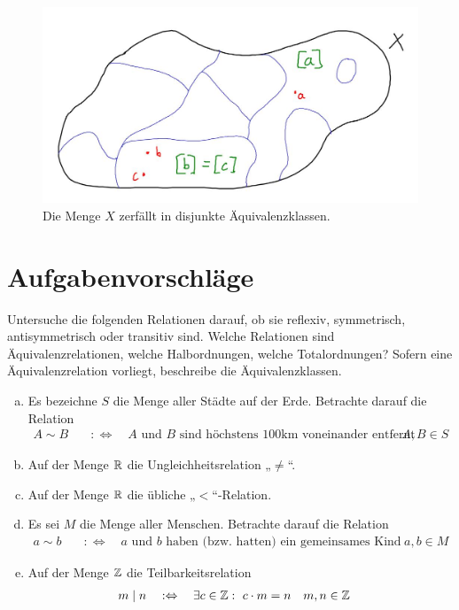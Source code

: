 \begin{figure}[h]
	\centering
\includegraphics[width=12cm]{./_img/equivalence.jpeg}
	\caption{Die Menge $X$ zerfällt in disjunkte Äquivalenzklassen.}
\end{figure}




\clearpage
\section{Aufgabenvorschläge}





\begin{aufg}
Untersuche die folgenden Relationen darauf, ob sie reflexiv, symmetrisch, antisymmetrisch oder transitiv sind. Welche Relationen sind Äquivalenzrelationen, welche Halbordnungen, welche Totalordnungen? Sofern eine Äquivalenzrelation vorliegt, beschreibe die Äquivalenzklassen.
\begin{enumerate}[a)]
\item Es bezeichne $S$ die Menge aller Städte auf der Erde. Betrachte darauf die Relation
\begin{align*}
 A \sim B \quad& :\Leftrightarrow\quad \text{$A$ und $B$ sind höchstens 100km voneinander entfernt} && A,B\in S
\end{align*}
\item Auf der Menge ${\mathbb R}$ die Ungleichheitsrelation „$\neq$“.
\item Auf der Menge ${\mathbb R}$ die übliche „$<$“-Relation.
\item Es sei $M$ die Menge aller Menschen. Betrachte darauf die Relation
\begin{align*}
 a \sim b \quad& :\Leftrightarrow\quad \text{$a$ und $b$ haben (bzw. hatten) ein gemeinsames Kind} && a,b\in M
\end{align*}
\item Auf der Menge ${\mathbb Z}$ die Teilbarkeitsrelation
\begin{align*}
 m\mid n \quad& :\Leftrightarrow\quad \exists c\in {\mathbb Z}:\  c\cdot m=n && m,n \in {\mathbb Z}
\end{align*}
\end{enumerate}
\end{aufg}


